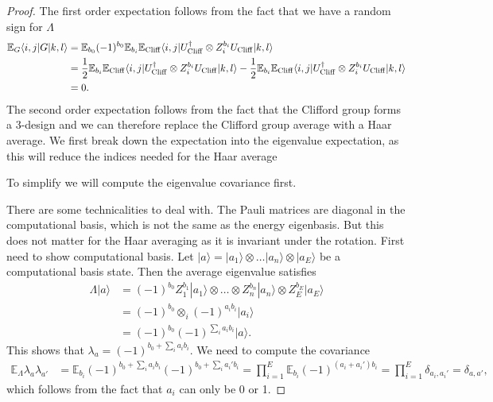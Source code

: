 \documentclass[
 amsmath,amssymb,
 aps,
onecolumn, 
nofootinbib]{revtex4-2}
\newcommand{\ket}[1]{|#1\rangle}
\newcommand{\bra}[1]{\langle #1|}
\newcommand{\EE}{\mathbb{E}}
\newcommand{\tp}{\otimes}
\begin{document}
\begin{proof}
The first order expectation follows from the fact that we have a random sign for $\Lambda$
\begin{align}
    \EE_G \bra{i,j} G \ket{k,l} &= \EE_{b_0} (-1)^{b_0} \EE_{b_i} \EE_{\rm Cliff} \bra{i,j} U_{\rm Cliff}^\dagger \tp Z_i^{b_i} U_{\rm Cliff} \ket{k,l} \nonumber \\
    &= \frac{1}{2}  \EE_{b_i} \EE_{\rm Cliff} \bra{i,j} U_{\rm Cliff}^\dagger \tp Z_i^{b_i} U_{\rm Cliff} \ket{k,l} - \frac{1}{2}  \EE_{b_i} \EE_{\rm Cliff} \bra{i,j} U_{\rm Cliff}^\dagger \tp Z_i^{b_i} U_{\rm Cliff} \ket{k,l} \nonumber \\
    &= 0.
\end{align}
The second order expectation follows from the fact that the Clifford group forms a 3-design \cite{webb2015clifford} and we can therefore replace the Clifford group average with a Haar average. We first break down the expectation into the eigenvalue expectation, as this will reduce the indices needed for the Haar average

To simplify we will compute the eigenvalue covariance first. 

There are some technicalities to deal with. The Pauli matrices are diagonal in the computational basis, which is not the same as the energy eigenbasis. But this does not matter for the Haar averaging as it is invariant under the rotation. First need to show computational basis. Let $\ket{a} = \ket{a_1} \tp \ldots \ket{a_n} \tp \ket{a_E}$ be a computational basis state. Then the average eigenvalue satisfies
\begin{align}
     \Lambda \ket{a}  &= (-1)^{b_0} Z_1^{b_1} \ket{a_1} \tp \ldots \tp Z_n^{b_n} \ket{a_n} \tp Z_E^{b_E} \ket{a_E} \\
    &= (-1)^{b_0} \tp_i (-1)^{a_i b_i} \ket{a_i} \\
    &= (-1)^{b_0} (-1)^{\sum_i a_i b_i} \ket{a}.
\end{align}
This shows that $\lambda_a = (-1)^{b_0 + \sum_{i} a_i b_i}$. We need to compute the covariance
\begin{align}
    \EE_\Lambda \lambda_a \lambda_{a'} &= \EE_{b_i} (-1)^{b_0 + \sum_{i} a_i b_i} (-1)^{b_0 + \sum_{i} a_i' b_i} = \prod_{i = 1}^{E} \EE_{b_i} (-1)^{(a_i + a_i') b_i} = \prod_{i = 1}^E  \delta_{a_i, a_i'} = \delta_{a, a'},
\end{align}
which follows from the fact that $a_i$ can only be 0 or 1. 


\end{proof}
\end{document}

